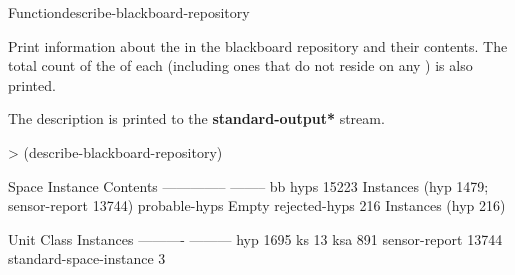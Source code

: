 \documentclass[10pt,twoside,english,pdftex]{article}
\begin{document}

\begin{functiondoc}{Function}{describe-blackboard-repository}{\noargs}

\fnsyntax

\fnpurpose 
{}%
%
%
Print information about the  in the blackboard
repository and their contents.  The total count of the
 of each  (including ones that
do not reside on any ) is also printed.

\fnpackage {}

\fnmodule {}

\fndescription
{}%
The description is printed to the {\bf *standard-output*} stream.

\fnexample
\begin{example}
> (describe-blackboard-repository)

Space Instance                Contents
--------------                --------
bb                            
   hyps                       15223 Instances (hyp 1479; sensor-report 13744)
   probable-hyps              Empty
   rejected-hyps              216 Instances (hyp 216)

Unit Class                    Instances
----------                    ---------
hyp                                1695
ks                                   13 
ksa                                 891
sensor-report                     13744
standard-space-instance               3
\end{example}

\end{functiondoc}

\end{document}
